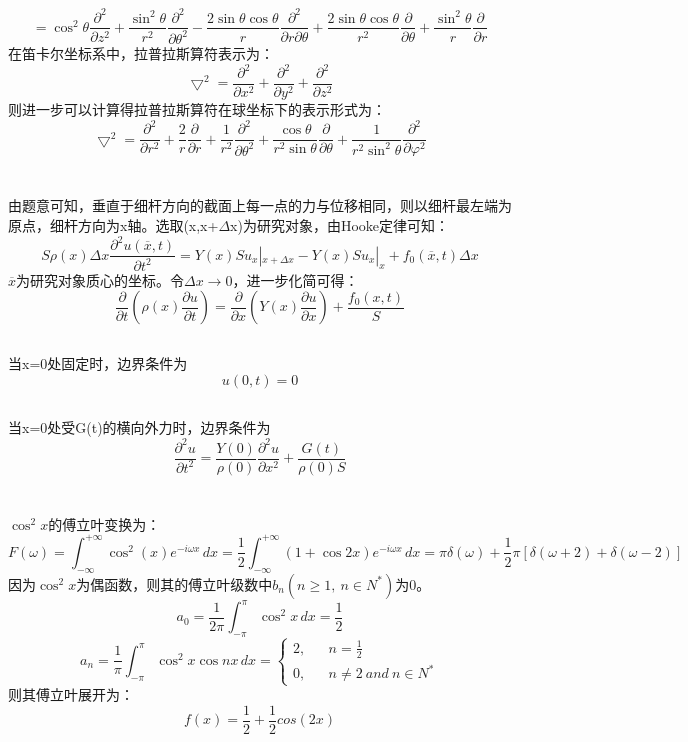 \documentclass[10.5pt]{article}
\begin{document}
$$ = \cos^2\theta\frac{\partial^2}{\partial z^2} + \frac{\sin^2\theta}{r^2}\frac{\partial^2}{\partial\theta^2} - \frac{2\sin\theta\cos\theta}{r}\frac{\partial^2}{\partial r \partial\theta } + \frac{2\sin\theta\cos\theta}{r^2}\frac{\partial}{\partial \theta} + \frac{\sin^2\theta }{r}\frac{\partial}{\partial r}$$\indent
在笛卡尔坐标系中，拉普拉斯算符表示为：$$\bigtriangledown ^2 = \frac{\partial ^2}{\partial x^2} + \frac{\partial ^2}{\partial y^2} + \frac{\partial ^2}{\partial z^2}$$\indent
则进一步可以计算得拉普拉斯算符在球坐标下的表示形式为：$$\bigtriangledown ^2 = \frac{\partial ^2}{\partial r^2} + \frac{2}{r}\frac{\partial}{\partial r} + \frac{1}{r^2}\frac{\partial ^2}{\partial \theta^2} + \frac{\cos\theta}{r^2\sin\theta}\frac{\partial }{\partial \theta} + \frac{1}{r^2\sin^2\theta}\frac{\partial^2}{\partial\varphi^2}$$

\section{}
由题意可知，垂直于细杆方向的截面上每一点的力与位移相同，则以细杆最左端为原点，细杆方向为x轴。选取(x,x+$\Delta$x)为研究对象，由Hooke定律可知：$$S\rho(x)\Delta x\frac{\partial^2 u(\overline{x} ,t)}{\partial t^2} = Y(x)Su_x|_{x+\Delta x} - Y(x)Su_x|_{x} + f_0(\overline{x},t)\Delta x$$\indent
$\overline{x}$为研究对象质心的坐标。令$\Delta x \to 0$，进一步化简可得：$$\frac{\partial }{\partial t}\left(\rho(x)\frac{\partial u}{\partial t}\right) = \frac{\partial}{\partial x}\left(Y(x)\frac{\partial u}{\partial x}\right) + \frac{f_0(x,t)}{S}$$
\subsection{}
当x=0处固定时，边界条件为$$u(0,t) = 0$$
\subsection{}
当x=0处受G(t)的横向外力时，边界条件为$$\frac{\partial^2u}{\partial t^2} = \frac{Y(0)}{\rho(0)}\frac{\partial^2u}{\partial x^2} + \frac{G(t)}{\rho(0)S}$$

\section{}
$\cos^2x$的傅立叶变换为：$$F(\omega ) = \int_{-\infty}^{+\infty} \cos^2(x)e^{-i\omega x}\,dx = \frac{1}{2}\int_{-\infty}^{+\infty} (1 + \cos2x)e^{-i\omega x}\,dx = \pi\delta(\omega)+\frac{1}{2}\pi[\delta(\omega+2)+\delta(\omega-2)]$$
\indent
因为$\cos^2x$为偶函数，则其的傅立叶级数中$b_n(n\geqslant 1,~ n\in N^*)$为0。$$a_0 = \frac{1}{2\pi}\int_{-\pi}^{\pi} \cos^2x \,dx = \frac{1}{2}$$ 
\begin{equation*}
a_n = \frac{1}{\pi}\int_{-\pi}^{\pi} \cos^2x \cos nx \,dx = 
\left\{
    \begin{array}{rcl}
        2, & & n = \frac{1}{2} \\
        0, & & n \neq 2 ~ and ~ n\in N^*
    \end{array}
\right.
\end{equation*}
\indent
则其傅立叶展开为：$$f(x) = \frac{1}{2} + \frac{1}{2}cos(2x)$$
\end{document}
